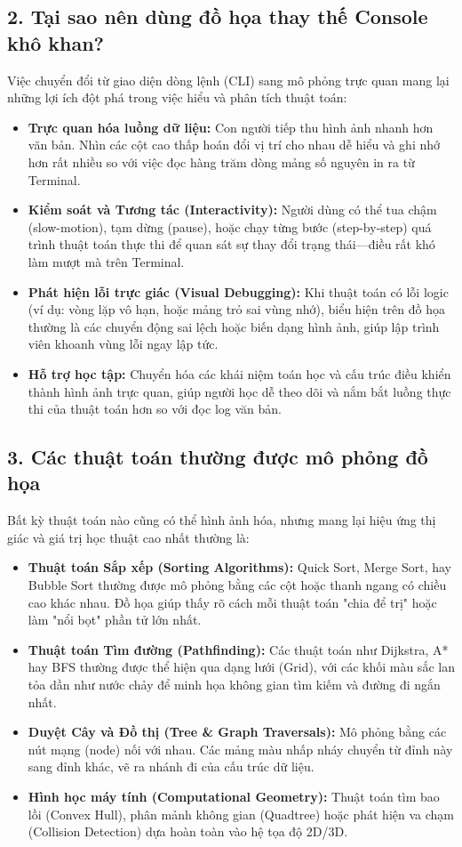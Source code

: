 \documentclass[12pt,a4paper,oneside]{report}
\begin{document}
\subsection*{2. Tại sao nên dùng đồ họa thay thế Console khô khan?}
Việc chuyển đổi từ giao diện dòng lệnh (CLI) sang mô phỏng trực quan mang lại những lợi ích đột phá trong việc hiểu và phân tích thuật toán:

\begin{itemize}
    \item \textbf{Trực quan hóa luồng dữ liệu:} Con người tiếp thu hình ảnh nhanh hơn văn bản. Nhìn các cột cao thấp hoán đổi vị trí cho nhau dễ hiểu và ghi nhớ hơn rất nhiều so với việc đọc hàng trăm dòng mảng số nguyên in ra từ Terminal.
    \item \textbf{Kiểm soát và Tương tác (Interactivity):} Người dùng có thể tua chậm (slow-motion), tạm dừng (pause), hoặc chạy từng bước (step-by-step) quá trình thuật toán thực thi để quan sát sự thay đổi trạng thái—điều rất khó làm mượt mà trên Terminal.
    \item \textbf{Phát hiện lỗi trực giác (Visual Debugging):} Khi thuật toán có lỗi logic (ví dụ: vòng lặp vô hạn, hoặc mảng trỏ sai vùng nhớ), biểu hiện trên đồ họa thường là các chuyển động sai lệch hoặc biến dạng hình ảnh, giúp lập trình viên khoanh vùng lỗi ngay lập tức.
    \item \textbf{Hỗ trợ học tập:} Chuyển hóa các khái niệm toán học và cấu trúc điều khiển thành hình ảnh trực quan, giúp người học dễ theo dõi và nắm bắt luồng thực thi của thuật toán hơn so với đọc log văn bản.
\end{itemize}

\subsection*{3. Các thuật toán thường được mô phỏng đồ họa}
Bất kỳ thuật toán nào cũng có thể hình ảnh hóa, nhưng mang lại hiệu ứng thị giác và giá trị học thuật cao nhất thường là:

\begin{itemize}
    \item \textbf{Thuật toán Sắp xếp (Sorting Algorithms):} Quick Sort, Merge Sort, hay Bubble Sort thường được mô phỏng bằng các cột hoặc thanh ngang có chiều cao khác nhau. Đồ họa giúp thấy rõ cách mỗi thuật toán "chia để trị" hoặc làm "nổi bọt" phần tử lớn nhất.
    \item \textbf{Thuật toán Tìm đường (Pathfinding):} Các thuật toán như Dijkstra, A* hay BFS thường được thể hiện qua dạng lưới (Grid), với các khối màu sắc lan tỏa dần như nước chảy để minh họa không gian tìm kiếm và đường đi ngắn nhất.
    \item \textbf{Duyệt Cây và Đồ thị (Tree \& Graph Traversals):} Mô phỏng bằng các nút mạng (node) nối với nhau. Các mảng màu nhấp nháy chuyển từ đỉnh này sang đỉnh khác, vẽ ra nhánh đi của cấu trúc dữ liệu.
    \item \textbf{Hình học máy tính (Computational Geometry):} Thuật toán tìm bao lồi (Convex Hull), phân mảnh không gian (Quadtree) hoặc phát hiện va chạm (Collision Detection) dựa hoàn toàn vào hệ tọa độ 2D/3D.
\end{itemize}
\end{document}

